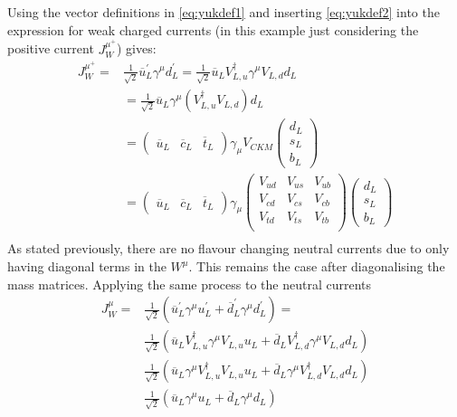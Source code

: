 Using the vector definitions in \autoref{eq:yukdef1} and inserting \autoref{eq:yukdef2} into the expression for weak charged currents (in this example just considering the positive current $J^{\mu^{+}}_{W}$) gives:
\begin{equation}
\begin{split}
  J^{\mu^{+}}_{W} =
  & \frac{1}{\sqrt{2}}\overline{u}^{\prime}_{L}\gamma^{\mu}d^{\prime}_{L} = \frac{1}{\sqrt{2}}\overline{u}_{L}V^{\dagger}_{L,u}\gamma^{\mu}V_{L,d}d_{L} \\
  & = \frac{1}{\sqrt{2}}\overline{u}_{L}\gamma^{\mu}(V^{\dagger}_{L,u}V_{L,d})d_{L} \\
  & = \begin{pmatrix}\overline{u}_{L}&\overline{c}_{L}&\overline{t}_{L}\end{pmatrix}\gamma_{\mu}V_{CKM}\begin{pmatrix}d_{L}\\s_{L}\\b_{L}\end{pmatrix} \\
  & = \begin{pmatrix}\overline{u}_{L}&\overline{c}_{L}&\overline{t}_{L}\end{pmatrix}\gamma_{\mu}\begin{pmatrix}V_{ud}&V_{us}&V_{ub}\\V_{cd}&V_{cs}&V_{cb}\\V_{td}&V_{ts}&V_{tb}\\\end{pmatrix} \begin{pmatrix}  d_{L}\\s_{L}\\b_{L}\end{pmatrix} \\
  \end{split}
\end{equation}
As stated previously, there are no flavour changing neutral currents due to only having diagonal terms in the $W^{\mu}$. This remains the case after diagonalising the mass matrices. Applying the same process to the neutral currents
\begin{equation}
  \begin{split}
  J^{\mu}_{W} =
  & \frac{1}{\sqrt{2}}(\overline{u}^{\prime}_{L}\gamma^{\mu}u^{\prime}_{L}  + \overline{d}^{\prime}_{L}\gamma^{\mu}d^{\prime}_{L}) = \\
  & \frac{1}{\sqrt{2}}(\overline{u}_{L}V^{\dagger}_{L,u}\gamma^{\mu}V_{L,u}u_{L}  + \overline{d}_{L}V^{\dagger}_{L,d}\gamma^{\mu}V_{L,d}d_{L}) \\
  & \frac{1}{\sqrt{2}}(\overline{u}_{L}\gamma^{\mu}V^{\dagger}_{L,u}V_{L,u}u_{L}  + \overline{d}_{L}\gamma^{\mu}V^{\dagger}_{L,d}V_{L,d}d_{L}) \\
  & \frac{1}{\sqrt{2}}(\overline{u}_{L}\gamma^{\mu}u_{L}  + \overline{d}_{L}\gamma^{\mu}d_{L}) \\
  \end{split}
\end{equation}
